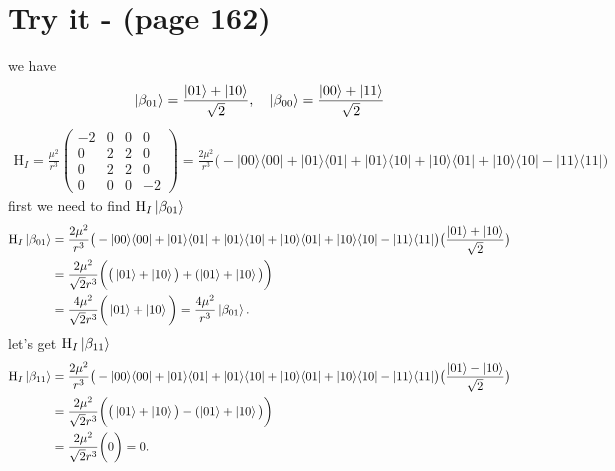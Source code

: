 \documentclass{article}
\newcommand{\op}[2]{|#1\rangle \langle#2|}
\begin{document}
\section*{Try it - (page 162)}
we have
\begin{align*}
   \ket{\beta_{01}} = \frac{\ket{01}+\ket{10}}{\sqrt{2}}, \quad
   \ket{\beta_{00}} = \frac{\ket{00}+\ket{11}}{\sqrt{2}}
\end{align*}
\begin{align*}
   \text{H}_{I} = \frac{\mu^2}{r^3} 
   \begin{pmatrix}
      -2 & 0 & 0 & 0 \\
      0 & 2 & 2 & 0 \\
      0 & 2 & 2 & 0 \\
      0 & 0 & 0 & -2
   \end{pmatrix}
   = \frac{2\mu^2}{r^3} \big(-\op{00}{00}+\op{01}{01}+\op{01}{10}+\op{10}{01}+\op{10}{10}-\op{11}{11}\big)
\end{align*}
first we need to find $\text{H}_{I}\ket{\beta_{01}}$
\begin{align*}
\text{H}_{I}\ket{\beta_{01}} &= \frac{2\mu^2}{r^3} \big(-\op{00}{00}+\op{01}{01}+\op{01}{10}+\op{10}{01}+\op{10}{10}-\op{11}{11}\big)  
\big( \frac{\ket{01}+\ket{10}}{\sqrt{2}}\big) \\
&= \frac{2\mu^2}{\sqrt{2}r^3}\bigg(\big(\ket{01}+\ket{10}\big)+(\ket{01}+\ket{10}\big)\bigg) \\
&= \frac{4\mu^2}{\sqrt{2}r^3}\bigg(\ket{01}+\ket{10}\bigg) = \frac{4\mu^2}{r^3}\ket{\beta_{01}}.
\end{align*}
let's get $\text{H}_{I}\ket{\beta_{11}}$
\begin{align*}
   \text{H}_{I}\ket{\beta_{11}} &= \frac{2\mu^2}{r^3} \big(-\op{00}{00}+\op{01}{01}+\op{01}{10}+\op{10}{01}+\op{10}{10}-\op{11}{11}\big)  
   \big( \frac{\ket{01}-\ket{10}}{\sqrt{2}}\big) \\
   &= \frac{2\mu^2}{\sqrt{2}r^3}\bigg(\big(\ket{01}+\ket{10}\big)-(\ket{01}+\ket{10}\big)\bigg) \\
   &= \frac{2\mu^2}{\sqrt{2}r^3}\bigg(0\bigg) = 0.
   \end{align*}
\end{document}
